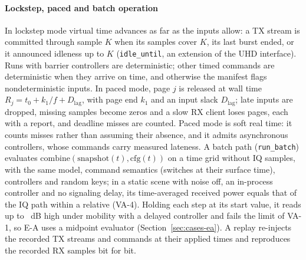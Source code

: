 \paragraph*{Lockstep, paced and batch operation}
In lockstep mode virtual time advances as far as the inputs allow: a TX
stream is committed through sample $K$ when its samples cover $K$, its last burst ended, or it
announced idleness up to $K$ (\texttt{idle\_until}, an extension of the UHD interface). Runs
with barrier controllers are deterministic; other timed commands are deterministic when they
arrive on time, and otherwise the manifest flags nondeterministic inputs.
In paced mode, page $j$ is released at wall time
$R_j=t_0+k_1/f+D_{\mathrm{lag}}$, with page end $k_1$ and an input slack $D_{\mathrm{lag}}$;
late inputs are dropped, missing samples become zeros and a slow RX client loses pages, each
with a report, and deadline misses are counted. Paced mode is soft real time: it counts misses rather
than assuming their absence, and it admits asynchronous controllers, whose commands carry
measured lateness. A batch path (\texttt{run\_batch}) evaluates
$\mathrm{combine}(\mathrm{snapshot}(t),\mathrm{cfg}(t))$ on a time grid without IQ samples, with
the same model, command semantics (switches at their surface time), controllers and random
keys; in a static scene with noise off, an in-process controller and no signaling delay, its
time-averaged received power equals that of the IQ path within a relative \numVaFourRelTol{}
(VA-4). Holding each step at its start value, it reads up to \numVaOneLeftMaxDb~dB high under
mobility with a delayed controller and fails the limit of VA-1, so E-A uses a midpoint
evaluator (Section~\ref{sec:cases-ea}).
A replay re-injects the recorded TX streams and commands at their applied times
and reproduces the recorded RX samples bit for bit.

